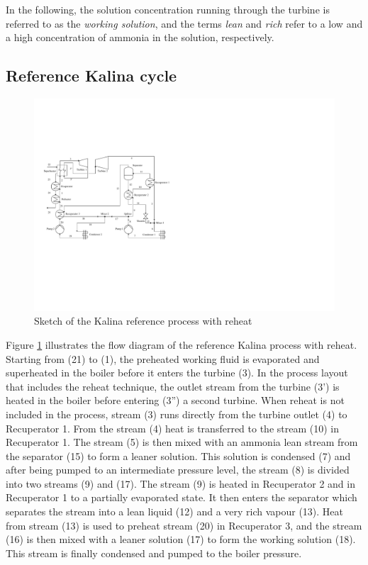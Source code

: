 \documentclass[final,times,5p]{elsarticle}
\begin{document}
In the following, the solution concentration running through the turbine is referred to as the \emph{working solution}, and the terms \emph{lean} and \emph{rich} refer to a low and a high concentration of ammonia in the solution, respectively.

\subsection{Reference Kalina cycle}
\label{sec:kalina_cycle}
\begin{figure}[htbp]
\centering
\includegraphics[width=0.9\linewidth]{Drawing_Kalina_Baselinevsd.pdf}
\caption{Sketch of the Kalina reference process with reheat}
\label{fig:kalina_cycle}
\end{figure}

Figure \ref{fig:kalina_cycle} illustrates the flow diagram of the reference Kalina process with reheat. Starting from (21) to (1), the preheated working fluid is evaporated and superheated in the boiler before it enters the turbine (3). In the process layout that includes the reheat technique, the outlet stream from the turbine (3') is heated in the boiler before entering (3'') a second turbine. When reheat is not included in the process, stream (3) runs directly from the turbine outlet (4) to Recuperator 1. From the stream (4) heat is transferred to the stream (10) in Recuperator 1. The stream (5) is then mixed with an ammonia lean stream from the separator (15) to form a leaner solution. This solution is condensed (7) and after being pumped to an intermediate pressure level, the stream (8) is divided into two streams (9) and (17). The stream (9) is heated in Recuperator 2 and in Recuperator 1 to a partially evaporated state. It then enters the separator which separates the stream into a lean liquid (12) and a very rich vapour (13). Heat from stream (13) is used to preheat stream (20) in Recuperator 3, and the stream (16) is then mixed with a leaner solution (17) to form the working solution (18). This stream is finally condensed and pumped to the boiler pressure. 
\end{document}
